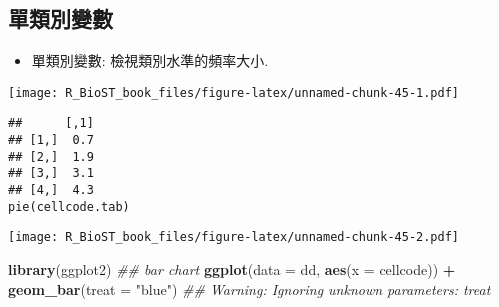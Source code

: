 \documentclass[
]{book}
\newenvironment{Shaded}{\begin{snugshade}}{\end{snugshade}}
\newcommand{\CommentTok}[1]{\textcolor[rgb]{0.56,0.35,0.01}{\textit{#1}}}
\newcommand{\DataTypeTok}[1]{\textcolor[rgb]{0.13,0.29,0.53}{#1}}
\newcommand{\DecValTok}[1]{\textcolor[rgb]{0.00,0.00,0.81}{#1}}
\newcommand{\KeywordTok}[1]{\textcolor[rgb]{0.13,0.29,0.53}{\textbf{#1}}}
\newcommand{\NormalTok}[1]{#1}
\newcommand{\OperatorTok}[1]{\textcolor[rgb]{0.81,0.36,0.00}{\textbf{#1}}}
\newcommand{\StringTok}[1]{\textcolor[rgb]{0.31,0.60,0.02}{#1}}
\providecommand{\tightlist}{%
  \setlength{\itemsep}{0pt}\setlength{\parskip}{0pt}}
\begin{document}
\hypertarget{ux55aeux985eux5225ux8b8aux6578}{%
\subsection{單類別變數}\label{ux55aeux985eux5225ux8b8aux6578}}

\begin{itemize}
\tightlist
\item
  單類別變數: 檢視類別水準的頻率大小.
\end{itemize}

\begin{Shaded}
\end{Shaded}

\texttt{[image: R\_BioST\_book\_files/figure-latex/unnamed-chunk-45-1.pdf]}

\begin{verbatim}
##      [,1]
## [1,]  0.7
## [2,]  1.9
## [3,]  3.1
## [4,]  4.3
pie(cellcode.tab)
\end{verbatim}

\texttt{[image: R\_BioST\_book\_files/figure-latex/unnamed-chunk-45-2.pdf]}

\begin{Shaded}
\begin{Highlighting}[]
\KeywordTok{library}\NormalTok{(ggplot2)}
\CommentTok{\#\# bar chart}
\KeywordTok{ggplot}\NormalTok{(}\DataTypeTok{data =}\NormalTok{ dd, }\KeywordTok{aes}\NormalTok{(}\DataTypeTok{x =}\NormalTok{ cellcode)) }\OperatorTok{+}
\StringTok{  }\KeywordTok{geom\_bar}\NormalTok{(}\DataTypeTok{treat =} \StringTok{"blue"}\NormalTok{)}
\CommentTok{\#\# Warning: Ignoring unknown parameters: treat}
\end{Highlighting}
\end{Shaded}
\end{document}

